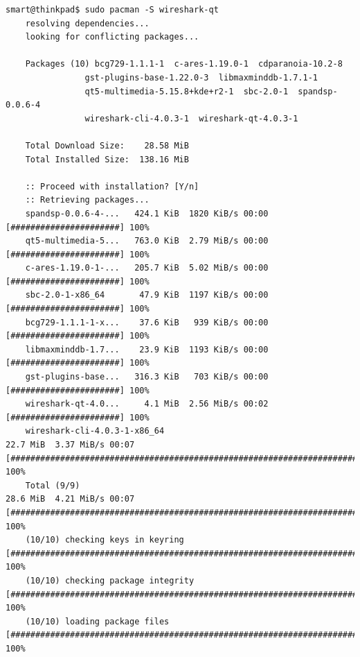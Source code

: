 \begin{Verbatim}[frame=single,breaklines=true,breakanywhere=true]
    smart@thinkpad$ sudo pacman -S wireshark-qt
    resolving dependencies...
    looking for conflicting packages...

    Packages (10) bcg729-1.1.1-1  c-ares-1.19.0-1  cdparanoia-10.2-8
                gst-plugins-base-1.22.0-3  libmaxminddb-1.7.1-1
                qt5-multimedia-5.15.8+kde+r2-1  sbc-2.0-1  spandsp-0.0.6-4
                wireshark-cli-4.0.3-1  wireshark-qt-4.0.3-1

    Total Download Size:    28.58 MiB
    Total Installed Size:  138.16 MiB

    :: Proceed with installation? [Y/n] 
    :: Retrieving packages...
    spandsp-0.0.6-4-...   424.1 KiB  1820 KiB/s 00:00 [######################] 100%
    qt5-multimedia-5...   763.0 KiB  2.79 MiB/s 00:00 [######################] 100%
    c-ares-1.19.0-1-...   205.7 KiB  5.02 MiB/s 00:00 [######################] 100%
    sbc-2.0-1-x86_64       47.9 KiB  1197 KiB/s 00:00 [######################] 100%
    bcg729-1.1.1-1-x...    37.6 KiB   939 KiB/s 00:00 [######################] 100%
    libmaxminddb-1.7...    23.9 KiB  1193 KiB/s 00:00 [######################] 100%
    gst-plugins-base...   316.3 KiB   703 KiB/s 00:00 [######################] 100%
    wireshark-qt-4.0...     4.1 MiB  2.56 MiB/s 00:02 [######################] 100%
    wireshark-cli-4.0.3-1-x86_64                                                                                       22.7 MiB  3.37 MiB/s 00:07 [########################################################################################] 100%
    Total (9/9)                                                                                                        28.6 MiB  4.21 MiB/s 00:07 [########################################################################################] 100%
    (10/10) checking keys in keyring                                                                                                               [########################################################################################] 100%
    (10/10) checking package integrity                                                                                                             [########################################################################################] 100%
    (10/10) loading package files                                                                                                                  [########################################################################################] 100%

\end{Verbatim}
